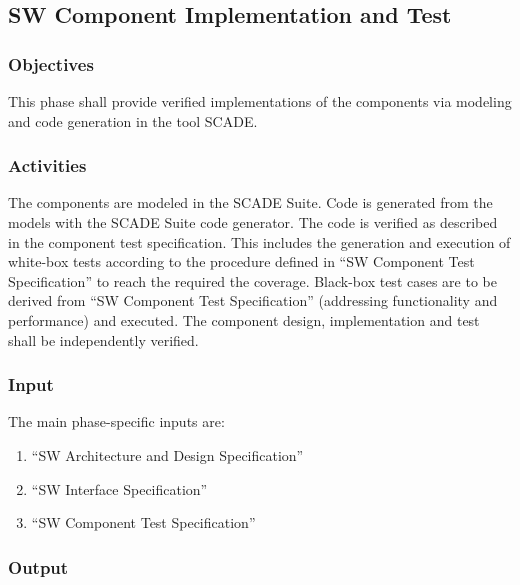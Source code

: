 \documentclass{template/openetcs_article}
\begin{document}
\subsection{SW Component Implementation and Test}
\label{sec:sw-component-implementation}

\subsubsection{Objectives}
\label{sec:5-objectives}

This phase shall provide verified implementations of the components
via modeling and code generation in the tool SCADE.



\subsubsection{Activities}
\label{sec:5-activities}

The components are modeled in the SCADE Suite. Code is generated from
the models with the SCADE Suite code generator. The code is verified
as described in the component test specification. This includes the
generation and execution of white-box tests according to the procedure
defined in ``SW Component Test Specification'' to reach the required
the coverage. Black-box test cases are to be derived from ``SW
Component Test Specification'' (addressing functionality and
performance) and executed. The component design, implementation and
test shall be independently verified.

\subsubsection{Input}
\label{sec:5-input}

The main phase-specific inputs are:
\begin{enumerate}
\item ``SW Architecture and Design Specification''
\item ``SW Interface Specification''
\item ``SW Component Test Specification''
\end{enumerate}

\subsubsection{Output}
\label{sec:5-output}
\end{document}
